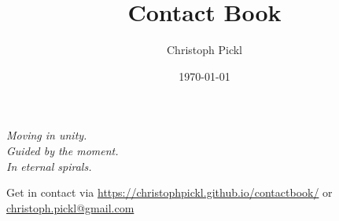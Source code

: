\documentclass[11pt]{book}
\title{Contact Book}
\date{\today}
\author{Christoph Pickl}
\begin{document}

\maketitle

\tableofcontents
\vfill
\begin{center}
	\textit{Moving in unity.}\\
	\textit{Guided by the moment.}\\
	\textit{In eternal spirals.}
\end{center}
\vfill
\noindent
\footnotesize{Get in contact via \url{https://christophpickl.github.io/contactbook/} or \href{mailto:christoph.pickl@gmail.com}{christoph.pickl@gmail.com}}
\newpage

















\printglossaries
\end{document}
